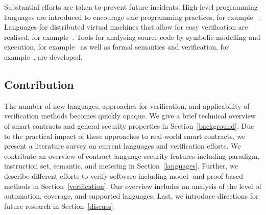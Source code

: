 Substantial efforts are taken to prevent future incidents. 
High-level programming languages are introduced to encourage safe programming practices, for example ~\cite{Hirai2018Bamboo,Ethereum2018Vyper,Schrans2018}.
Languages for distributed virtual machines that allow for easy verification are realised, for example~\cite{Sergey2018,DynamicLedgerSolutions2017,Popejoy2017,Kasampalis2018}.
Tools for analysing source code by symbolic modelling and execution, for example~\cite{Luu2016,Tsankov2017,Kalra2018,Albert2018} as well as formal semantics and verification, for example~\cite{Bhargavan2016,Hildenbrandt2017,Hirai2017}, are developed.

\subsection{Contribution} The number of new languages, approaches for verification, and applicability of verification methods becomes quickly opaque. 
We give a brief technical overview of smart contracts and general security properties in Section~\ref{background}. Due to the practical impact of these approaches to real-world smart contracts, we present a literature survey on current languages and verification efforts.
We contribute an overview of contract language security features including paradigm, instruction set, semantic, and metering in Section~\ref{languages}.
Further, we describe different efforts to verify software including model- and proof-based methods in Section~\ref{verification}. Our overview includes an analysis of the level of automation, coverage, and supported languages.
Last, we introduce directions for future research in Section~\ref{discuss}.

